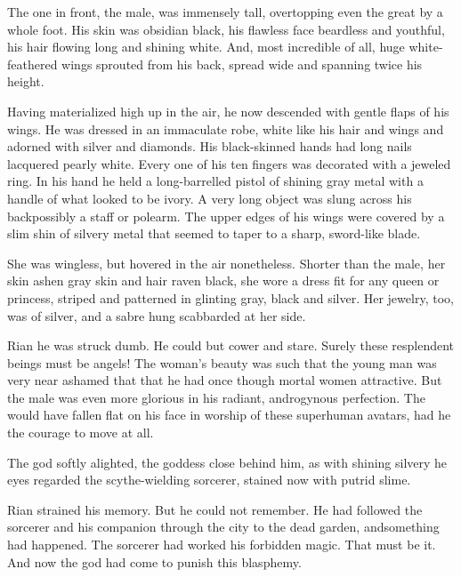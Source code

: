 \begin{garbage}
The one in front, the male, was immensely tall, overtopping even the great \scatha{} by a whole foot. 
His skin was obsidian black, his flawless face beardless and youthful, his hair flowing long and shining white. 
And, most incredible of all, huge white-feathered wings sprouted from his back, spread wide and spanning twice his height.

Having materialized high up in the air, he now descended with gentle flaps of his wings. 
He was dressed in an immaculate robe, white like his hair and wings and adorned with silver and diamonds. 
His black-skinned hands had long nails lacquered pearly white. 
Every one of his ten fingers was decorated with a jeweled ring. 
In his hand he held a long-barrelled pistol of shining gray metal with a handle of what looked to be ivory. 
A very long object was slung across his back\dash possibly a staff or polearm. 
The upper edges of his wings were covered by a slim shin of silvery metal that seemed to taper to a sharp, sword-like blade. 

She was wingless, but hovered in the air nonetheless. 
Shorter than the male, her skin ashen gray skin and hair raven black,
she wore a dress fit for any queen or princess, striped and patterned in glinting gray, black and silver. Her jewelry, too, was of silver, and a sabre hung scabbarded at her side. 

Rian he was struck dumb. He could but cower and stare. 
Surely these resplendent beings must be angels! 
The woman's beauty was such that the young man was very near ashamed that that he had once though mortal women attractive. 
But the male was even more glorious in his radiant, androgynous perfection. 
\tho{%
  Such magnificence. Such might. 
  No, not an angel. A god!
  Before my eyes\prikker a god in the flesh!}
The \human{} would have fallen flat on his face in worship of these superhuman avatars, had he the courage to move at all.

The god softly alighted, the goddess close behind him, as with shining silvery he eyes regarded the scythe-wielding sorcerer, stained now with putrid slime. 

Rian strained his memory. 
But he could not remember. He had followed the sorcerer and his companion through the city to the dead garden, and\prikker something had happened. The sorcerer had worked his forbidden magic. That must be it. And now the god had come to punish this blasphemy. 










\end{garbage}

